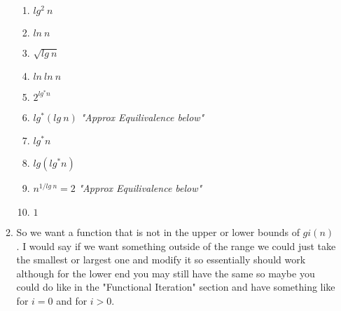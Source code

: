 \documentclass{article}
\begin{document}
\begin{enumerate}
\begin{enumerate}
\begin{enumerate}
        \item $lg^2\:n$
        \item $ln\:n$
        \item $\sqrt{lg\:n}$
        \item $ln\:ln\:n$
        \item $2^{lg^{*}n}$
        \item $lg^*(lg\:n)$ \textit{"Approx Equilivalence below"}
        \item $lg^*n$
        \item $lg(lg^{*}n)$
        \item $n^{1/lg\:n} = 2$ \textit{"Approx Equilivalence below"}
        \item $1$        
      \end{enumerate}
      \item So we want a function that is not in the upper or lower bounds of $gi(n)$. I would say if we want something outside of the range we could just take the smallest or largest one and modify it so essentially  should work although for the lower end you may still have the same so maybe you could do like in the "Functional Iteration" section and have something like  for $i = 0$ and  for $i > 0$.
    \end{enumerate}
    
  \end{enumerate}
\end{document}
